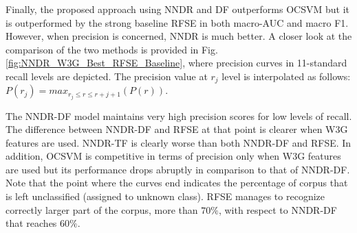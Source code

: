 \documentclass[runningheads]{llncs}
\begin{document}
Finally, the proposed approach using NNDR and DF outperforms OCSVM but it is outperformed by the strong baseline RFSE in both macro-AUC and macro F1. However, when precision is concerned, NNDR is much better. A closer look at  the comparison of the two methods is provided in Fig. \ref{fig:NNDR_W3G_Best_RFSE_Baseline}, where precision curves in 11-standard recall levels are depicted. The precision value at $r_j$ level is interpolated as follows: $P(r_j)=max_{r_j \leq r \leq r+{j+1}}(P(r))$.

The NNDR-DF model maintains very high precision scores for low levels of recall. The difference between NNDR-DF and RFSE at that point is clearer when W3G features are used. NNDR-TF is clearly worse than both NNDR-DF and RFSE. In addition, OCSVM is competitive in terms of precision only when W3G features are used but its performance drops abruptly in comparison to that of NNDR-DF. Note that the point where the curves end indicates the percentage of corpus that is left unclassified (assigned to unknown class). RFSE manages to recognize correctly larger part of the corpus, more than $70\%$, with respect to NNDR-DF that reaches $60\%$. 
\end{document}
